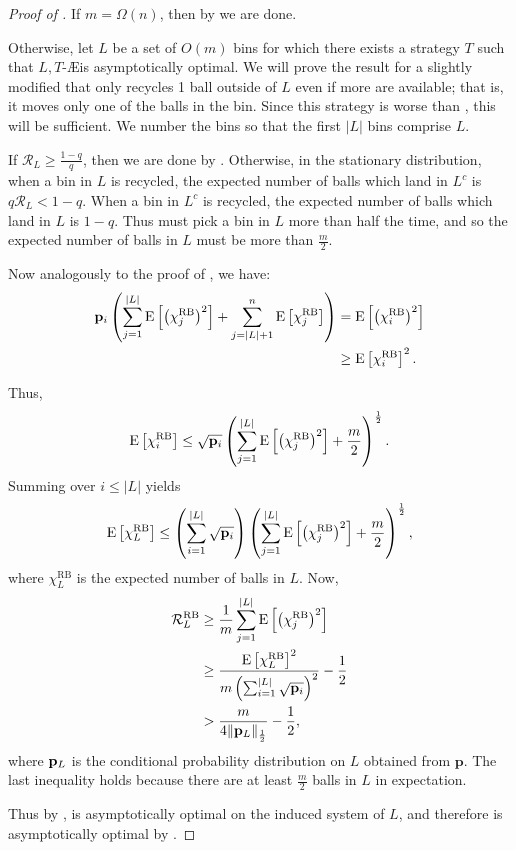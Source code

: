 \begin{proof}[Proof of ]
	If $m=\Omega(n)$, then by  we are done.

	Otherwise, let $L$ be a set of $O(m)$ bins for which there exists a
	strategy $T$ such that $L,T$-\AE is asymptotically optimal. We will prove
	the result for a slightly modified \RB that only recycles 1 ball outside of
	$L$ even if more are available; that is, it moves only one of the balls in
	the bin. Since this strategy is worse than \RB, this will be sufficient. We
	number the bins so that the first $|L|$ bins comprise $L$.
	
	If $\mathcal{R}_L \geq \frac{1-q}{q}$, then we are done by
	. Otherwise, in the stationary distribution, when a
	bin in $L$ is recycled, the expected number of balls which land in $L^c$ is
	$q\mathcal{R}_L < 1-q$. When a bin in $L^c$ is recycled, the expected
	number of balls which land in $L$ is $1-q$. Thus \RB must pick a bin in $L$
	more than half the time, and so the expected number of balls in $L$ must be
	more than $\frac{m}{2}$.

	Now analogously to the proof of , we have:
	\begin{align*}
		\mathbf{p}_i\left(\sum_{j=1}^{|L|} \mathrm{E}\left[\left(\chi_j^\mathrm{RB}\right)^2\right] + \sum_{j=|L|+1}^n \mathrm{E}\left[\chi_j^\mathrm{RB}\right]\right) &= \mathrm{E}\left[\left(\chi_i^\mathrm{RB}\right)^2\right] \\
		&\geq \mathrm{E}\left[\chi_i^\mathrm{RB}\right]^2.
	\end{align*}

	Thus,
	\[ \mathrm{E}\left[\chi_i^\mathrm{RB}\right] \leq \sqrt{\mathbf{p}_i}\left(\sum_{j=1}^{|L|} \mathrm{E}\left[\left(\chi_j^\mathrm{RB}\right)^2\right] + \frac{m}{2}\right)^{\frac{1}{2}}.\]
	Summing over $i \leq |L|$ yields
	\[ \mathrm{E}\left[\chi_L^\mathrm{RB}\right] \leq \left(\sum_{i=1}^{|L|} \sqrt{\mathbf{p}_i}\right)\left(\sum_{j=1}^{|L|} \mathrm{E}\left[\left(\chi_j^\mathrm{RB}\right)^2\right] + \frac{m}{2}\right)^\frac{1}{2}, \]
	where $\chi_L^\mathrm{RB}$ is the expected number of balls in $L$. Now,
	\begin{align*}
		\mathcal{R}_L^\mathrm{RB} &\geq \frac{1}{m}\sum_{j=1}^{|L|} \mathrm{E}\left[\left(\chi_j^\mathrm{RB}\right)^2\right] \\
								  &\geq \frac{\mathrm{E}\left[\chi_L^\mathrm{RB}\right]^2}{m\left(\sum_{i=1}^{|L|} \sqrt{\mathbf{p}_i}\right)^2} - \frac{1}{2} \\
								  &> \frac{m}{4\|\mathbf{p}_L\|_{\frac{1}{2}}} - \frac{1}{2},
	\end{align*}
	where $\mathbf{p}_L$ is the conditional probability distribution on $L$ obtained
	from $\mathbf{p}$. The last inequality holds because there are at least
	$\frac{m}{2}$ balls in $L$ in expectation.

	Thus by , \RB is asymptotically optimal on the induced
	system of $L$, and therefore \RB is asymptotically optimal by
	.
\end{proof}




